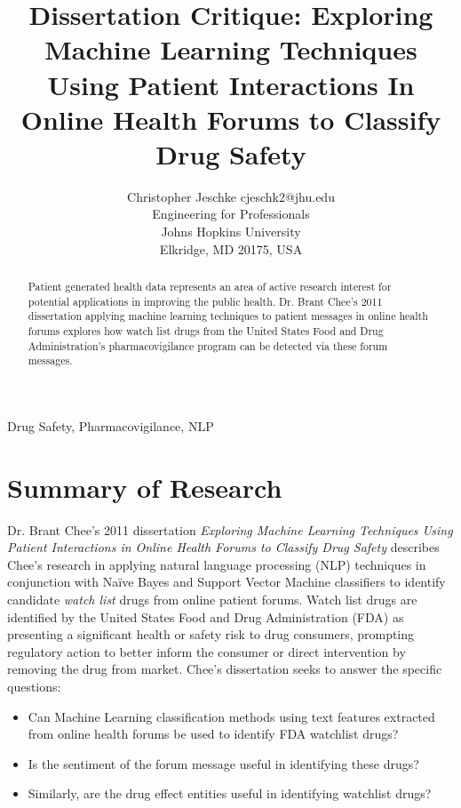 \documentclass[twoside,11pt]{article}
\begin{document}
\title{Dissertation Critique: Exploring Machine Learning Techniques Using Patient
      Interactions In Online Health Forums to Classify Drug Safety}

\author{\name Christopher Jeschke \email cjeschk2@jhu.edu \\
       \addr Engineering for Professionals\\
       Johns Hopkins University\\
       Elkridge, MD 20175, USA}


\maketitle


\singlespacing

\begin{abstract}%
  Patient generated health data represents an area of active research interest
  for potential applications in improving the public health. Dr. Brant Chee's 2011 dissertation applying machine learning techniques to patient messages in online health forums explores how watch list drugs from the United States Food and Drug Administration's pharmacovigilance program can be detected via these forum messages.
\end{abstract}

\begin{keywords}
  Drug Safety, Pharmacovigilance, NLP
\end{keywords}

\section{Summary of Research}
Dr. Brant Chee's 2011 dissertation \textit{Exploring Machine Learning Techniques Using
Patient Interactions in Online Health Forums to Classify Drug Safety} describes
Chee's research in applying natural language processing (NLP) techniques in conjunction with Na\"ive Bayes and Support Vector Machine classifiers to identify candidate \textit{watch list} drugs from online patient forums. Watch list drugs are identified by the United States Food and Drug Administration (FDA) as presenting a significant health or safety risk to drug consumers, prompting regulatory action to better inform the consumer or direct intervention by removing the drug from market. Chee's dissertation seeks to answer the specific questions:
\begin{itemize}
  \item Can Machine Learning classification methods using text features extracted from online health forums be used to identify FDA watchlist drugs?
  \item Is the sentiment of the forum message useful in identifying these drugs?
  \item Similarly, are the drug effect entities useful in identifying watchlist drugs?
\end{itemize}
\end{document}
